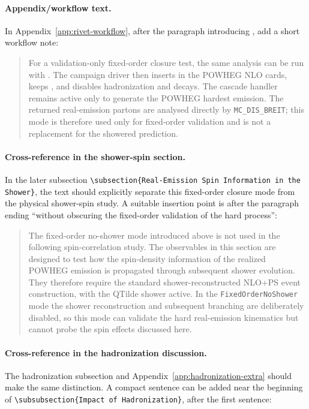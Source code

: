 \paragraph{Appendix/workflow text.}
In Appendix~\ref{app:rivet-workflow}, after the paragraph introducing
, add a short workflow
note:

\begin{quote}
\small
For a validation-only fixed-order closure test, the same analysis can be run
with . The campaign driver then inserts
in the POWHEG NLO cards, keeps
, and disables
hadronization and decays. The cascade handler remains active only to generate
the POWHEG hardest emission. The returned real-emission partons are analysed
directly by \texttt{MC\_DIS\_BREIT}; this mode is therefore used only for
fixed-order validation and is not a replacement for the showered prediction.
\end{quote}

\paragraph{Cross-reference in the shower-spin section.}
In the later subsection
\texttt{\textbackslash subsection\{Real-Emission Spin Information in the Shower\}},
the text should explicitly separate this fixed-order closure mode from the
physical shower-spin study. A suitable insertion point is after the paragraph
ending ``without obscuring the fixed-order validation of the hard process'':

\begin{quote}
\small
The fixed-order no-shower mode introduced above is not used in the following
spin-correlation study. The observables in this section are designed to test
how the spin-density information of the realized POWHEG emission is propagated
through subsequent shower evolution. They therefore require the standard
shower-reconstructed NLO+PS event construction, with the QTilde shower active.
In the \texttt{FixedOrderNoShower} mode the shower reconstruction and subsequent
branching are deliberately disabled, so this mode can validate the hard
real-emission kinematics but cannot probe the spin effects discussed here.
\end{quote}

\paragraph{Cross-reference in the hadronization discussion.}
The hadronization subsection and Appendix~\ref{app:hadronization-extra} should
make the same distinction. A compact sentence can be added near the beginning
of \texttt{\textbackslash subsubsection\{Impact of Hadronization\}}, after the
first sentence:

